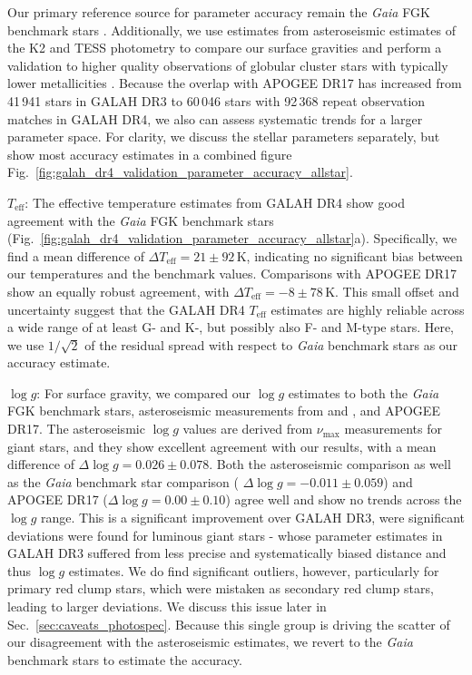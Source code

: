 \documentclass[
  journal=pasa,
  manuscript=research-paper, %
  year=2024,
  volume=37
]{cup-journal}
\newcommand{\Teff}{$T_\mathrm{eff}$\xspace}
\newcommand{\logg}{$\log g$\xspace}
\newcommand{\Gaia}{\textit{Gaia}\xspace}
\begin{document}
Our primary reference source for parameter accuracy remain the \Gaia FGK benchmark stars \citep{Jofre2014, Jofre2015, Jofre2018, Heiter2015}. Additionally, we use estimates from asteroseismic estimates of the K2 and TESS photometry \citep{Zinn2020, Hon2021} to compare our surface gravities and perform a validation to higher quality observations of globular cluster stars with typically lower metallicities \citep{Carretta2009c, Carretta2009, Johnson2010}. Because the overlap with APOGEE DR17 \citep{SDSSDR17} has increased from 41\,941 stars in GALAH DR3 to 60\,046 stars with 92\,368 repeat observation matches in GALAH DR4, we also can assess systematic trends for a larger parameter space. For clarity, we discuss the stellar parameters separately, but show most accuracy estimates in a combined figure Fig.~\ref{fig:galah_dr4_validation_parameter_accuracy_allstar}.

\Teff: The effective temperature estimates from GALAH DR4 show good agreement with the \Gaia FGK benchmark stars (Fig.~\ref{fig:galah_dr4_validation_parameter_accuracy_allstar}a). Specifically, we find a mean difference of $\Delta T_\mathrm{eff} = 21 \pm 92\,\mathrm{K}$, indicating no significant bias between our temperatures and the benchmark values. Comparisons with APOGEE DR17 show an equally robust agreement, with $\Delta T_\mathrm{eff} = -8 \pm 78\,\mathrm{K}$. This small offset and uncertainty suggest that the GALAH DR4 \Teff estimates are highly reliable across a wide range of at least G- and K-, but possibly also F- and M-type stars. Here, we use $1/\sqrt{2}$ of the residual spread with respect to \Gaia benchmark stars as our accuracy estimate.

\logg: For surface gravity, we compared our \logg estimates to both the \Gaia FGK benchmark stars, asteroseismic measurements from \citet{Zinn2020} and \citet{Hon2021}, and APOGEE DR17. The asteroseismic \logg values are derived from $\nu_\mathrm{max}$ measurements for giant stars, and they show excellent agreement with our results, with a mean difference of $\Delta \log g = 0.026 \pm 0.078$. Both the asteroseismic comparison as well as the \Gaia benchmark star comparison ( $\Delta \log g = -0.011 \pm 0.059$) and APOGEE DR17 ($\Delta \log g = 0.00 \pm 0.10$) agree well and show no trends across the \logg range. This is a significant improvement over GALAH DR3, were significant deviations were found for luminous giant stars - whose parameter estimates in GALAH DR3 suffered from less precise and systematically biased distance and thus \logg estimates. We do find significant outliers, however, particularly for primary red clump stars, which were mistaken as secondary red clump stars, leading to larger deviations. We discuss this issue later in Sec.~\ref{sec:caveats_photospec}. Because this single group is driving the scatter of our disagreement with the asteroseismic estimates, we revert to the \Gaia benchmark stars to estimate the accuracy.
\end{document}
